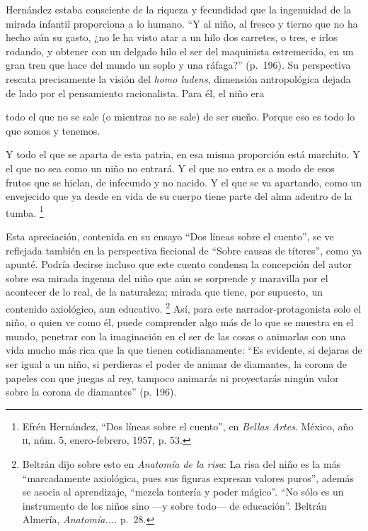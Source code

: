 \documentclass[14pt,twoside,final]{extbook} %
\let\oldfootnote\footnote
\renewcommand\footnote[1]{%
\oldfootnote{\hspace{1mm}#1}}
\begin{document}
Hernández estaba consciente de la riqueza y fecundidad que la ingenuidad de la mirada infantil proporciona a lo humano. ``Y al niño, al fresco y tierno que no ha hecho aún su gasto, ¿no le ha visto atar a un hilo dos carretes, o tres, e irlos rodando, y obtener con un delgado hilo el ser del maquinista estremecido, en un gran tren que hace del mundo un soplo y una ráfaga?'' (p.~196). Su perspectiva rescata precisamente la visión del \emph{homo ludens}, dimensión antropológica dejada de lado por el pensamiento racionalista. Para él, el niño era
\begin{quoting}
todo el que no se sale (o mientras no se sale) de ser sueño. Porque eso es todo lo que somos y tenemos.

Y todo el que se aparta de esta patria, en esa misma proporción está marchito. Y el que no sea como un niño no entrará. Y el que no entra es a modo de esos frutos que se hielan, de infecundo y no nacido. Y el que se va apartando, como un envejecido que ya desde en vida de su cuerpo tiene parte del alma adentro de la tumba.\footnote{Efrén Hernández, ``Dos líneas sobre el cuento'', en \emph{Bellas Artes}. México, año \textsc{ii}, núm. 5, enero-febrero, 1957, p. 53.}
\end{quoting}
Esta apreciación, contenida en su ensayo ``Dos líneas sobre el cuento'', se ve reflejada también en la perspectiva ficcional de ``Sobre causas de títeres'', como ya apunté. Podría decirse incluso que este cuento condensa la concepción del autor sobre esa mirada ingenua del niño que aún se sorprende y maravilla por el acontecer de lo real, de la naturaleza; mirada que tiene, por supuesto, un contenido axiológico, aun educativo.\footnote{Beltrán dijo sobre esto en \emph{Anatomía de la risa}: La risa del niño es la más ``marcadamente axiológica, pues sus figuras expresan valores puros'', además se asocia al aprendizaje, ``mezcla tontería y poder mágico''. ``No sólo es un instrumento de los niños sino ---y sobre todo--- de educación''. Beltrán Almería, \emph{Anatomía...}. p.~28.} Así, para este narrador-protagonista solo el niño, o quien ve como él, puede comprender algo más de lo que se muestra en el mundo, penetrar con la imaginación en el ser de las cosas o animarlas con una vida mucho más rica que la que tienen cotidianamente: ``Es evidente, si dejaras de ser igual a un niño, si perdieras el poder de animar de diamantes, la corona de papeles con que juegas al rey, tampoco animarás ni proyectarás ningún valor sobre la corona de diamantes'' (p. 196).
\end{document}

